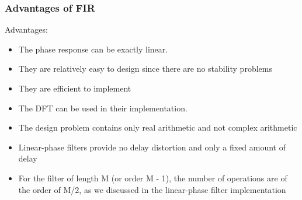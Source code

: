 \documentclass{article}
\begin{document}
\subsubsection{Advantages of FIR}
Advantages:
\begin{itemize}
    \item The phase response can be exactly linear.
    \item They are relatively easy to design since there are no stability problems
    \item They are efficient to implement
    \item The DFT can be used in their implementation.
    \item The design problem contains only real arithmetic and not complex arithmetic
    \item Linear-phase filters provide no delay distortion and only a fixed amount of delay
    \item For the filter of length M (or order M - 1), the number of operations are of the order of M/2, as we discussed in the linear-phase filter implementation

\end{itemize}
\end{document}
